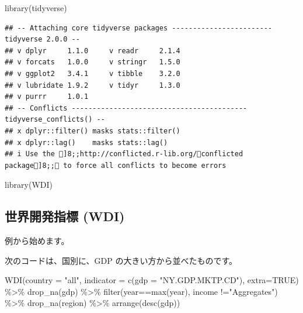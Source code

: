 \documentclass[
]{article}
\newenvironment{Shaded}{\begin{snugshade}}{\end{snugshade}}
\newcommand{\AttributeTok}[1]{\textcolor[rgb]{0.77,0.63,0.00}{#1}}
\newcommand{\ConstantTok}[1]{\textcolor[rgb]{0.00,0.00,0.00}{#1}}
\newcommand{\FunctionTok}[1]{\textcolor[rgb]{0.00,0.00,0.00}{#1}}
\newcommand{\NormalTok}[1]{#1}
\newcommand{\SpecialCharTok}[1]{\textcolor[rgb]{0.00,0.00,0.00}{#1}}
\newcommand{\StringTok}[1]{\textcolor[rgb]{0.31,0.60,0.02}{#1}}
\begin{document}
\begin{Shaded}
\begin{Highlighting}[]
\FunctionTok{library}\NormalTok{(tidyverse)}
\end{Highlighting}
\end{Shaded}

\begin{verbatim}
## -- Attaching core tidyverse packages ------------------------ tidyverse 2.0.0 --
## v dplyr     1.1.0     v readr     2.1.4
## v forcats   1.0.0     v stringr   1.5.0
## v ggplot2   3.4.1     v tibble    3.2.0
## v lubridate 1.9.2     v tidyr     1.3.0
## v purrr     1.0.1     
## -- Conflicts ------------------------------------------ tidyverse_conflicts() --
## x dplyr::filter() masks stats::filter()
## x dplyr::lag()    masks stats::lag()
## i Use the ]8;;http://conflicted.r-lib.org/conflicted package]8;; to force all conflicts to become errors
\end{verbatim}

\begin{Shaded}
\begin{Highlighting}[]
\FunctionTok{library}\NormalTok{(WDI)}
\end{Highlighting}
\end{Shaded}

\hypertarget{ux4e16ux754cux958bux767aux6307ux6a19-wdi}{%
\subsection{世界開発指標
(WDI)}\label{ux4e16ux754cux958bux767aux6307ux6a19-wdi}}

例から始めます。

次のコードは、国別に、GDP の大きい方から並べたものです。

\begin{Shaded}
\begin{Highlighting}[]
\FunctionTok{WDI}\NormalTok{(}\AttributeTok{country =} \StringTok{"all"}\NormalTok{, }\AttributeTok{indicator =} \FunctionTok{c}\NormalTok{(}\AttributeTok{gdp =} \StringTok{"NY.GDP.MKTP.CD"}\NormalTok{),}
    \AttributeTok{extra=}\ConstantTok{TRUE}\NormalTok{) }\SpecialCharTok{\%\textgreater{}\%} \FunctionTok{drop\_na}\NormalTok{(gdp) }\SpecialCharTok{\%\textgreater{}\%}
  \FunctionTok{filter}\NormalTok{(year}\SpecialCharTok{==}\FunctionTok{max}\NormalTok{(year), income }\SpecialCharTok{!=}\StringTok{"Aggregates"}\NormalTok{) }\SpecialCharTok{\%\textgreater{}\%} 
  \FunctionTok{drop\_na}\NormalTok{(region) }\SpecialCharTok{\%\textgreater{}\%} \FunctionTok{arrange}\NormalTok{(}\FunctionTok{desc}\NormalTok{(gdp))}
\end{Highlighting}
\end{Shaded}
\end{document}

